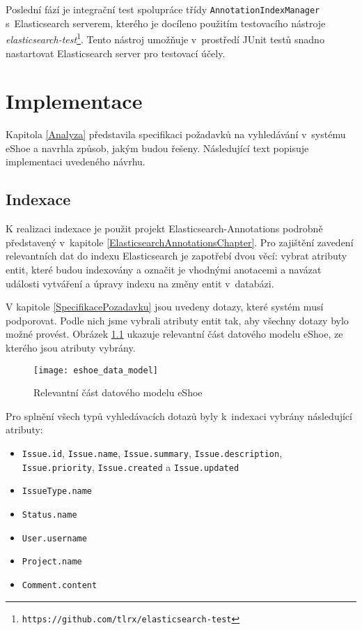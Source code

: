 \documentclass[11pt,oneside]{fithesis2}
\begin{document}
Poslední fází je integrační test spolupráce třídy \texttt{AnnotationIndexManager} s~Elasticsearch serverem, kterého je docíleno použitím testovacího nástroje \emph{elasticsearch-test}\footnote{\texttt{https://github.com/tlrx/elasticsearch-test}}. Tento nástroj umožňuje v~prostředí JUnit testů snadno nastartovat Elasticsearch server pro testovací účely.

\chapter{Implementace}
\label{ImplementaceChapter}
Kapitola \ref{Analyza} představila specifikaci požadavků na vyhledávání v~systému eShoe a navrhla způsob, jakým budou řešeny. Následující text popisuje implementaci uvedeného návrhu.

\section{Indexace}
\label{ImplementaceIndexace}
K realizaci indexace je použit projekt Elasticsearch-Annotations podrobně představený v~kapitole \ref{ElasticsearchAnnotationsChapter}. Pro zajištění zavedení relevantních dat do indexu Elasticsearch je zapotřebí dvou věcí: vybrat atributy entit, které budou indexovány a označit je vhodnými anotacemi a navázat události vytváření a úpravy indexu na změny entit v~databázi.

V kapitole \ref{SpecifikacePozadavku} jsou uvedeny dotazy, které systém musí podporovat. Podle nich jsme vybrali atributy entit tak, aby všechny dotazy bylo možné provést. Obrázek \ref{DatovyModelEshoe} ukazuje relevantní část datového modelu eShoe, ze kterého jsou atributy vybrány.

\begin{figure}[htb]
	\begin{center}
		\texttt{[image: eshoe\_data\_model]}
	\end{center}
	\caption{Relevantní část datového modelu eShoe}	
	\label{DatovyModelEshoe}
\end{figure}

Pro splnění všech typů vyhledávacích dotazů byly k~indexaci vybrány následující atributy:
\begin{itemize}
	\item \texttt{Issue.id}, \texttt{Issue.name}, \texttt{Issue.summary}, \texttt{Issue.description}, \\ \texttt{Issue.priority}, \texttt{Issue.created} a \texttt{Issue.updated}
	\item \texttt{IssueType.name}
	\item \texttt{Status.name}
	\item \texttt{User.username}
	\item \texttt{Project.name}
	\item \texttt{Comment.content}
\end{itemize}
\end{document}
